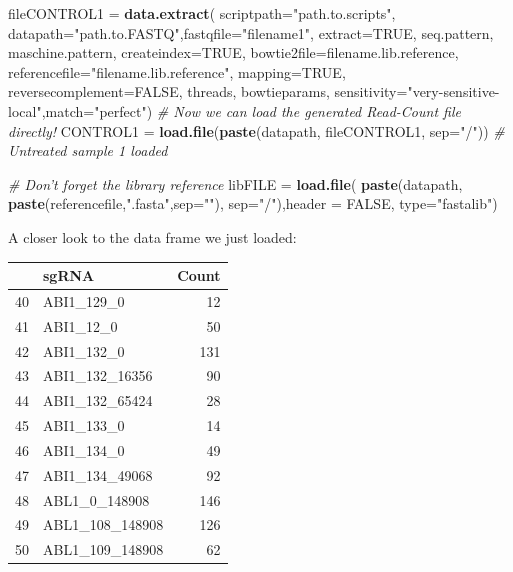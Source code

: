 \documentclass[]{article}
\newenvironment{Shaded}{\begin{snugshade}}{\end{snugshade}}
\newcommand{\KeywordTok}[1]{\textcolor[rgb]{0.13,0.29,0.53}{\textbf{{#1}}}}
\newcommand{\DataTypeTok}[1]{\textcolor[rgb]{0.13,0.29,0.53}{{#1}}}
\newcommand{\StringTok}[1]{\textcolor[rgb]{0.31,0.60,0.02}{{#1}}}
\newcommand{\CommentTok}[1]{\textcolor[rgb]{0.56,0.35,0.01}{\textit{{#1}}}}
\newcommand{\OtherTok}[1]{\textcolor[rgb]{0.56,0.35,0.01}{{#1}}}
\newcommand{\NormalTok}[1]{{#1}}
\begin{document}
\begin{Shaded}
\begin{Highlighting}[]
\NormalTok{fileCONTROL1 =}\StringTok{ }\KeywordTok{data.extract}\NormalTok{(}
  \DataTypeTok{scriptpath=}\StringTok{"path.to.scripts"}\NormalTok{, }\DataTypeTok{datapath=}\StringTok{"path.to.FASTQ"}\NormalTok{,}\DataTypeTok{fastqfile=}\StringTok{"filename1"}\NormalTok{,}
  \DataTypeTok{extract=}\OtherTok{TRUE}\NormalTok{, seq.pattern, maschine.pattern, }\DataTypeTok{createindex=}\OtherTok{TRUE}\NormalTok{,}
  \DataTypeTok{bowtie2file=}\NormalTok{filename.lib.reference, }\DataTypeTok{referencefile=}\StringTok{"filename.lib.reference"}\NormalTok{,}
  \DataTypeTok{mapping=}\OtherTok{TRUE}\NormalTok{, }\DataTypeTok{reversecomplement=}\OtherTok{FALSE}\NormalTok{, threads, bowtieparams,}
  \DataTypeTok{sensitivity=}\StringTok{"very-sensitive-local"}\NormalTok{,}\DataTypeTok{match=}\StringTok{"perfect"}\NormalTok{)  }
\CommentTok{# Now we can load the generated Read-Count file directly!}
\NormalTok{CONTROL1 =}\StringTok{ }\KeywordTok{load.file}\NormalTok{(}\KeywordTok{paste}\NormalTok{(datapath, fileCONTROL1, }\DataTypeTok{sep=}\StringTok{"/"}\NormalTok{)) }\CommentTok{# Untreated sample 1 loaded}

\CommentTok{# Don't forget the library reference}
\NormalTok{libFILE =}\StringTok{ }\KeywordTok{load.file}\NormalTok{(}
  \KeywordTok{paste}\NormalTok{(datapath, }\KeywordTok{paste}\NormalTok{(referencefile,}\StringTok{".fasta"}\NormalTok{,}\DataTypeTok{sep=}\StringTok{""}\NormalTok{), }\DataTypeTok{sep=}\StringTok{"/"}\NormalTok{),}\DataTypeTok{header =} \OtherTok{FALSE}\NormalTok{,}
  \DataTypeTok{type=}\StringTok{"fastalib"}\NormalTok{)}
\end{Highlighting}
\end{Shaded}

A closer look to the data frame we just loaded:

\begin{longtable}[c]{@{}llr@{}}
\toprule
& sgRNA & Count\tabularnewline
\midrule
\endhead
40 & ABI1\_129\_0 & 12\tabularnewline
41 & ABI1\_12\_0 & 50\tabularnewline
42 & ABI1\_132\_0 & 131\tabularnewline
43 & ABI1\_132\_16356 & 90\tabularnewline
44 & ABI1\_132\_65424 & 28\tabularnewline
45 & ABI1\_133\_0 & 14\tabularnewline
46 & ABI1\_134\_0 & 49\tabularnewline
47 & ABI1\_134\_49068 & 92\tabularnewline
48 & ABL1\_0\_148908 & 146\tabularnewline
49 & ABL1\_108\_148908 & 126\tabularnewline
50 & ABL1\_109\_148908 & 62\tabularnewline
\bottomrule
\end{longtable}
\end{document}
